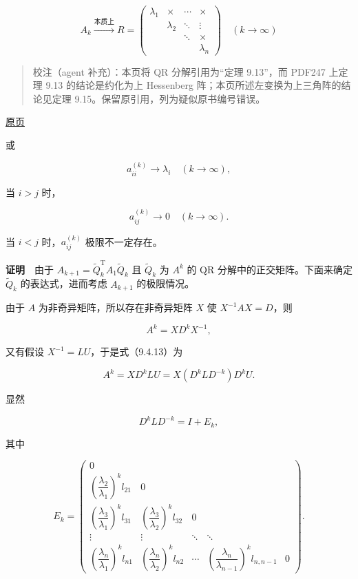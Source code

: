 \documentclass[
  10pt,
  fontset=fandol]{ctexart}
\begin{document}
\[
A_k\xrightarrow{\text{本质上}}R=
\begin{pmatrix}
\lambda_1&\times&\cdots&\times\\
&\lambda_2&\ddots&\vdots\\
&&\ddots&\times\\
&&&\lambda_n
\end{pmatrix}\quad(k\to\infty)
\]

\begin{quote}
校注（agent 补充）：本页将 QR 分解引用为``定理 9.13''，而 PDF247 上定理 9.13 的结论是约化为上 Hessenberg 阵；本页所述左变换为上三角阵的结论见定理 9.15。保留原引用，列为疑似原书编号错误。
\end{quote}

\href{../../source-images/pdf-254.jpeg}{原页}

或

\[
a_{ii}^{(k)}\to\lambda_i\quad(k\to\infty),
\tag{9.4.11}
\]

当 \(i>j\) 时，

\[
a_{ij}^{(k)}\to0\quad(k\to\infty).
\tag{9.4.12}
\]

当 \(i<j\) 时，\(a_{ij}^{(k)}\) 极限不一定存在。

\textbf{证明}　由于 \(A_{k+1}=\widetilde Q_k^{\mathrm T}A_1\widetilde Q_k\) 且 \(\widetilde Q_k\) 为 \(A^k\) 的 QR 分解中的正交矩阵。下面来确定 \(\widetilde Q_k\) 的表达式，进而考虑 \(A_{k+1}\) 的极限情况。

由于 \(A\) 为非奇异矩阵，所以存在非奇异矩阵 \(X\) 使 \(X^{-1}AX=D\)，则

\[
A^k=XD^kX^{-1},
\tag{9.4.13}
\]

又有假设 \(X^{-1}=LU\)，于是式（9.4.13）为

\[
A^k=XD^kLU=X(D^kLD^{-k})D^kU.
\]

显然

\[
D^kLD^{-k}=I+E_k,
\]

其中

\[
E_k=\begin{pmatrix}
0&&&&\\
\left(\dfrac{\lambda_2}{\lambda_1}\right)^k l_{21}&0&&&\\
\left(\dfrac{\lambda_3}{\lambda_1}\right)^k l_{31}&\left(\dfrac{\lambda_3}{\lambda_2}\right)^k l_{32}&0&&\\
\vdots&\vdots&\ddots&\ddots&\\
\left(\dfrac{\lambda_n}{\lambda_1}\right)^k l_{n1}&\left(\dfrac{\lambda_n}{\lambda_2}\right)^k l_{n2}&\cdots&\left(\dfrac{\lambda_n}{\lambda_{n-1}}\right)^k l_{n,n-1}&0
\end{pmatrix}.
\]
\end{document}
